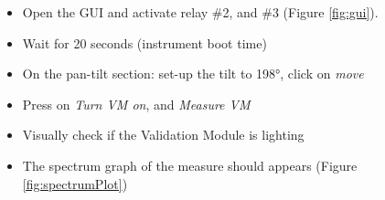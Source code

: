 \begin{itemize}
	\item Open the GUI and activate relay \#2, and \#3 (Figure
		\ref{fig:gui}).
	\item Wait for 20 seconds (instrument boot time)
	\item On the pan-tilt section: set-up the tilt to 198°, click on \textit{move}
	\item Press on \textit{Turn VM on}, and \textit{Measure VM}
	\item Visually check if the Validation Module is lighting
	\item The spectrum graph of the measure should appears (Figure
		\ref{fig:spectrumPlot})
\end{itemize}



